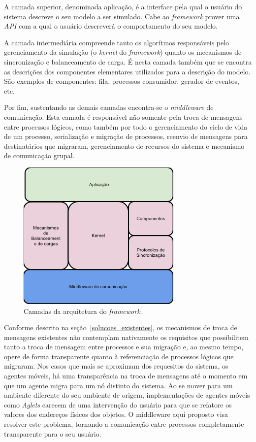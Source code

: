 A camada superior, denominada aplicação, é a interface pela qual o usuário do sistema descreve o seu modelo a ser simulado. Cabe ao \textit{framework} prover uma \textit{API} com a qual o usuário descreverá o comportamento do seu modelo.

A camada intermediária compreende tanto os algorítmos responsáveis pelo gerenciamento da simulação (o \textit{kernel} do \textit{framework}) quanto os mecanismos de sincronização e balanceamento de carga. É nesta camada também que se encontra as descrições dos componentes elementares utilizados para a descrição do modelo. São exemplos de componentes: fila, processos consumidor, gerador de eventos, etc.

Por fim, sustentando as demais camadas encontra-se o \textit{middleware} de comunicação. Esta camada é responsável não somente pela troca de mensagens entre processos lógicos, como também por todo o gerenciamento do ciclo de vida de um processo, serialização e migração de processos, reenvio de mensagens para destinatários que migraram, gerenciamento de recursos do sistema e mecanismo de comunicação grupal. 

\begin{figure}
  \centerline{\includegraphics{arquitetura_macro.png}}
  \caption{Camadas da arquitetura do \textit{framework}.}
\label{fig:arquitetura_macro}
\end{figure}

Conforme descrito na seção~\ref{solucoes_existentes}, os mecanismos de troca de mensagens existentes não contemplam nativamente os requisitos que possibilitem tanto a troca de mensagem entre processos e sua migração e, ao mesmo tempo, opere de forma transparente quanto à referenciação de processos lógicos que migraram. Nos casos que mais se aproximam dos requesitos do sistema, os agentes móveis, há uma transparência na troca de mensagens até o momento em que um agente migra para um nó distinto do sistema. Ao se mover para um ambiente diferente do seu ambiente de origem, implementações de agentes móveis como \textit{Aglets} carecem de uma intervenção do usuário para que se refatore os valores dos endereços físicos dos objetos. O middleware aqui proposto visa resolver este problema, tornando a comunicação entre processos completamente transparente para o seu usuário.

